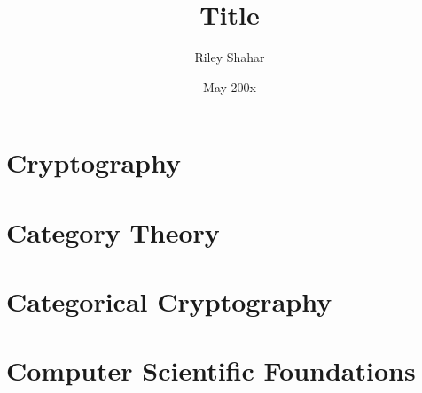 \documentclass[12pt,twoside]{reedthesis}
\title{Title} %
\author{Riley Shahar}
\date{May 200x} %
\begin{document}
\maketitle
\frontmatter
\pagestyle{empty} %




\tableofcontents



\mainmatter%
\pagestyle{fancyplain} %


\chapter{Cryptography}


\chapter{Category Theory}


\chapter{Categorical Cryptography}


\appendix
\chapter{Computer Scientific Foundations}



\backmatter{}
\nocite{*}
\printbibliography


\end{document}
